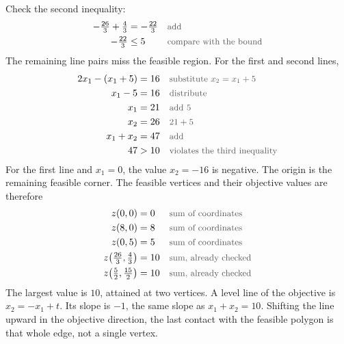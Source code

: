 \documentclass[a4paper,11pt]{article}
\newcommand{\why}[1]{\text{\small\color{black!65}#1}}
\begin{document}
Check the second inequality:
\begin{align*}
-\tfrac{26}{3}+\tfrac43&=-\tfrac{22}{3}&&\why{add}\\
-\tfrac{22}{3}&\leq 5&&\why{compare with the bound}
\end{align*}
The remaining line pairs miss the feasible region. For the first and second lines,
\begin{align*}
2x_1-(x_1+5)&=16&&\why{substitute $x_2=x_1+5$}\\
x_1-5&=16&&\why{distribute}\\
x_1&=21&&\why{add $5$}\\
x_2&=26&&\why{$21+5$}\\
x_1+x_2&=47&&\why{add}\\
47&>10&&\why{violates the third inequality}
\end{align*}
For the first line and $x_1=0$, the value $x_2=-16$ is negative. The origin is the remaining feasible corner. The feasible vertices and their objective values are therefore
\begin{align*}
z(0,0)&=0&&\why{sum of coordinates}\\
z(8,0)&=8&&\why{sum of coordinates}\\
z(0,5)&=5&&\why{sum of coordinates}\\
z\bigl(\tfrac{26}{3},\tfrac43\bigr)&=10&&\why{sum, already checked}\\
z\bigl(\tfrac52,\tfrac{15}{2}\bigr)&=10&&\why{sum, already checked}
\end{align*}
The largest value is $10$, attained at two vertices. A level line of the objective is $x_2=-x_1+t$. Its slope is $-1$, the same slope as $x_1+x_2=10$. Shifting the line upward in the objective direction, the last contact with the feasible polygon is that whole edge, not a single vertex.
\begin{center}
\end{center}
\end{document}
